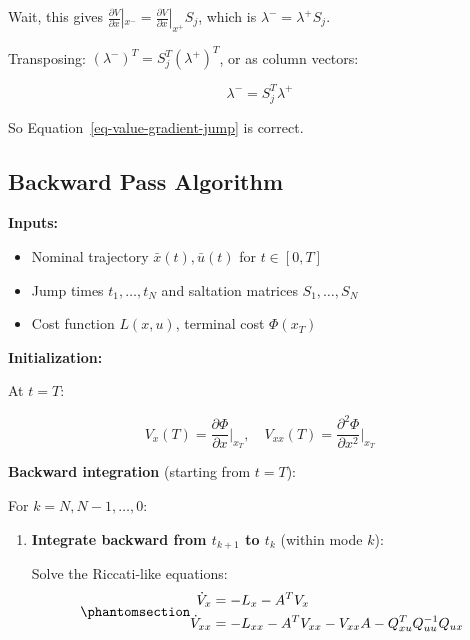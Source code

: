 \documentclass[
  letterpaper,
  DIV=11,
  numbers=noendperiod]{scrartcl}
\providecommand{\tightlist}{%
  \setlength{\itemsep}{0pt}\setlength{\parskip}{0pt}}\usepackage{longtable,booktabs,array}
\begin{document}
Wait, this gives
\(\frac{\partial V}{\partial x}|_{x^-} = \frac{\partial V}{\partial x}|_{x^+} S_j\),
which is \(\lambda^- = \lambda^+ S_j\).

Transposing: \((\lambda^-)^T = S_j^T (\lambda^+)^T\), or as column
vectors:

\[
\lambda^- = S_j^T \lambda^+
\]

So Equation~\ref{eq-value-gradient-jump} is correct.

\subsection{Backward Pass Algorithm}\label{backward-pass-algorithm}

\begin{tcolorbox}[enhanced jigsaw, coltitle=black, titlerule=0mm, toprule=.15mm, opacitybacktitle=0.6, left=2mm, opacityback=0, rightrule=.15mm, leftrule=.75mm, breakable, colframe=quarto-callout-note-color-frame, bottomtitle=1mm, toptitle=1mm, arc=.35mm, title=\textcolor{quarto-callout-note-color}{\faInfo}\hspace{0.5em}{Algorithm: Hybrid DDP Backward Pass}, bottomrule=.15mm, colback=white, colbacktitle=quarto-callout-note-color!10!white]

\textbf{Inputs:}

\begin{itemize}
\tightlist
\item
  Nominal trajectory \(\bar{x}(t), \bar{u}(t)\) for \(t \in [0, T]\)
\item
  Jump times \(t_1, \ldots, t_N\) and saltation matrices
  \(S_1, \ldots, S_N\)
\item
  Cost function \(L(x, u)\), terminal cost \(\Phi(x_T)\)
\end{itemize}

\textbf{Initialization:}

At \(t = T\):

\[
V_x(T) = \frac{\partial \Phi}{\partial x}\bigg|_{x_T}, \quad V_{xx}(T) = \frac{\partial^2 \Phi}{\partial x^2}\bigg|_{x_T}
\]

\textbf{Backward integration} (starting from \(t = T\)):

For \(k = N, N-1, \ldots, 0\):

\begin{enumerate}
\def\labelenumi{\arabic{enumi}.}
\item
  \textbf{Integrate backward from \(t_{k+1}\) to \(t_k\)} (within mode
  \(k\)):

  Solve the Riccati-like equations:
  \begin{equation}\phantomsection\label{eq-riccati-backward}{
  \begin{aligned}
  \dot{V}_x &= -L_x - A^T V_x \\
  \dot{V}_{xx} &= -L_{xx} - A^T V_{xx} - V_{xx} A - Q_{xu}^T Q_{uu}^{-1} Q_{ux}
  \end{aligned}
  }\end{equation}


\end{enumerate}
\end{tcolorbox}
\end{document}
